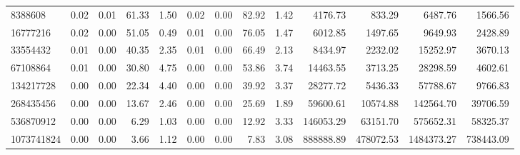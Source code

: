 \begin{tabular}{lrrrrrrrrrrrr}
8388608 & 0.02 & 0.01 & 61.33 & 1.50 & 0.02 & 0.00 & 82.92 & 1.42 & 4176.73 & 833.29 & 6487.76 & 1566.56 \\
16777216 & 0.02 & 0.00 & 51.05 & 0.49 & 0.01 & 0.00 & 76.05 & 1.47 & 6012.85 & 1497.65 & 9649.93 & 2428.89 \\
33554432 & 0.01 & 0.00 & 40.35 & 2.35 & 0.01 & 0.00 & 66.49 & 2.13 & 8434.97 & 2232.02 & 15252.97 & 3670.13 \\
67108864 & 0.01 & 0.00 & 30.80 & 4.75 & 0.00 & 0.00 & 53.86 & 3.74 & 14463.55 & 3713.25 & 28298.59 & 4602.61 \\
134217728 & 0.00 & 0.00 & 22.34 & 4.40 & 0.00 & 0.00 & 39.92 & 3.37 & 28277.72 & 5436.33 & 57788.67 & 9766.83 \\
268435456 & 0.00 & 0.00 & 13.67 & 2.46 & 0.00 & 0.00 & 25.69 & 1.89 & 59600.61 & 10574.88 & 142564.70 & 39706.59 \\
536870912 & 0.00 & 0.00 & 6.29 & 1.03 & 0.00 & 0.00 & 12.92 & 3.33 & 146053.29 & 63151.70 & 575652.31 & 58325.37 \\
1073741824 & 0.00 & 0.00 & 3.66 & 1.12 & 0.00 & 0.00 & 7.83 & 3.08 & 888888.89 & 478072.53 & 1484373.27 & 738443.09 \\
\bottomrule
\end{tabular}
